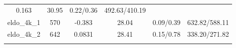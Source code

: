 \documentclass[]{article}
\begin{document}
\begin{longtable}[]{@{}cccccc@{}}
\begin{minipage}[t]{0.12\columnwidth}
0.163\strut
\end{minipage} & \begin{minipage}[t]{0.14\columnwidth}\centering\strut
30.95\strut
\end{minipage} & \begin{minipage}[t]{0.17\columnwidth}\centering\strut
0.22/0.36\strut
\end{minipage} & \begin{minipage}[t]{0.22\columnwidth}\centering\strut
492.63/410.19\strut
\end{minipage}\tabularnewline
\begin{minipage}[t]{0.12\columnwidth}\centering\strut
eldo\_4k\_1\strut
\end{minipage} & \begin{minipage}[t]{0.07\columnwidth}\centering\strut
570\strut
\end{minipage} & \begin{minipage}[t]{0.12\columnwidth}\centering\strut
-0.383\strut
\end{minipage} & \begin{minipage}[t]{0.14\columnwidth}\centering\strut
28.04\strut
\end{minipage} & \begin{minipage}[t]{0.17\columnwidth}\centering\strut
0.09/0.39\strut
\end{minipage} & \begin{minipage}[t]{0.22\columnwidth}\centering\strut
632.82/588.11\strut
\end{minipage}\tabularnewline
\begin{minipage}[t]{0.12\columnwidth}\centering\strut
eldo\_4k\_2\strut
\end{minipage} & \begin{minipage}[t]{0.07\columnwidth}\centering\strut
642\strut
\end{minipage} & \begin{minipage}[t]{0.12\columnwidth}\centering\strut
0.0831\strut
\end{minipage} & \begin{minipage}[t]{0.14\columnwidth}\centering\strut
28.41\strut
\end{minipage} & \begin{minipage}[t]{0.17\columnwidth}\centering\strut
0.15/0.78\strut
\end{minipage} & \begin{minipage}[t]{0.22\columnwidth}\centering\strut
338.20/271.82\strut
\end{minipage}\tabularnewline
\begin{minipage}[t]{0.12\columnwidth}\centering\strut

\end{minipage}
\end{longtable}
\end{document}
